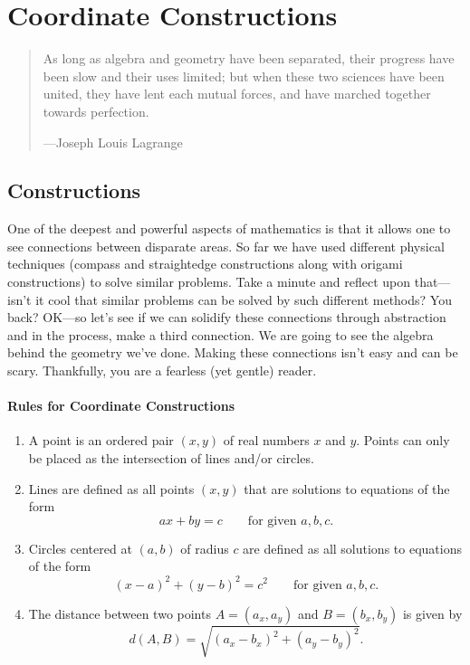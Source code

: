 \chapter{Coordinate Constructions}
\begin{quote} 
As long as algebra and geometry have been separated, their progress
have been slow and their uses limited; but when these two sciences
have been united, they have lent each mutual forces, and have marched
together towards perfection.


\hfill---Joseph Louis Lagrange
\end{quote}

\section{Constructions}

One of the deepest and powerful aspects of mathematics is that it
allows one to see connections between disparate areas. So far we have
used different physical techniques (compass and straightedge
constructions along with origami constructions) to solve similar
problems. Take a minute and reflect upon that---isn't it cool that
similar problems can be solved by such different methods?  You back?
OK---so let's see if we can solidify these connections through
abstraction and in the process, make a third connection. We are going
to see the algebra behind the geometry we've done. Making these
connections isn't easy and can be scary. Thankfully, you are a
fearless (yet gentle) reader.




\subsubsection*{Rules for Coordinate Constructions}

\begin{enumerate}
\item A point is an ordered pair $(x,y)$ of real numbers $x$ and
  $y$. Points can only be placed as the intersection of lines and/or
  circles.
\item Lines are defined as all points $(x,y)$ that are solutions to
  equations of the form
\[
ax + by = c \qquad \text{for given $a,b,c$.}
\]
\item Circles centered at $(a,b)$ of radius $c$ are defined as all
  solutions to equations of the form
\[
(x-a)^2 + (y-b)^2 = c^2 \qquad \text{for given $a,b,c$.}
\]
\item The distance between two points $A = (a_x,a_y)$ and $B =
  (b_x,b_y)$ is given by
\[
d(A,B) = \sqrt{(a_x-b_x)^2 + (a_y - b_y)^2}.
\]
\end{enumerate}



